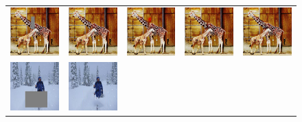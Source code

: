 \begin{figure}[!ht]
\centering
\small
\setlength\tabcolsep{1pt}
\begin{tabular}{ccccc}
\includegraphics[width=.2\textwidth]{figures/random/000000153299_ip.jpg}&
\includegraphics[width=.2\textwidth]{figures/random/000000153299_pm.jpg}&
\includegraphics[width=.2\textwidth]{figures/random/000000153299_sig.jpg}&
\includegraphics[width=.2\textwidth]{figures/random/000000153299_g.jpg}&
\includegraphics[width=.2\textwidth]{figures/random/000000153299.jpg}\\
\includegraphics[width=.2\textwidth]{figures/random/000000266409_ip.jpg}&
\includegraphics[width=.2\textwidth]{figures/random/000000266409_pm.jpg}&

\end{tabular}
\end{figure}

